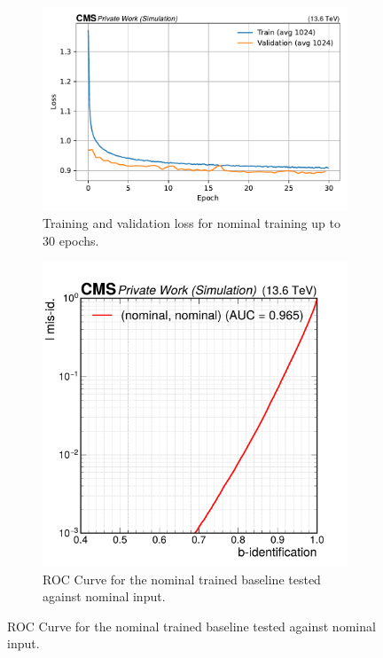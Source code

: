 \begin{figure}[htbp]
  \centering
  \begin{subfigure}[t]{0.59\textwidth}
    \includegraphics[width=\linewidth]{media/output/nominal_loss_validation.pdf}
    \caption{Training and validation loss for nominal training up to 30 epochs.}
    \label{fig:nominal_training}
  \end{subfigure}\hfill
  \begin{subfigure}[t]{0.41\textwidth}
    \includegraphics[width=\linewidth]{media/output/roc_bvsl_nominal_nominal.pdf}
    \caption{ROC Curve for the nominal trained baseline tested against nominal input.}
    \label{fig:nominal_roc}
  \end{subfigure}\hfill
\end{figure}

